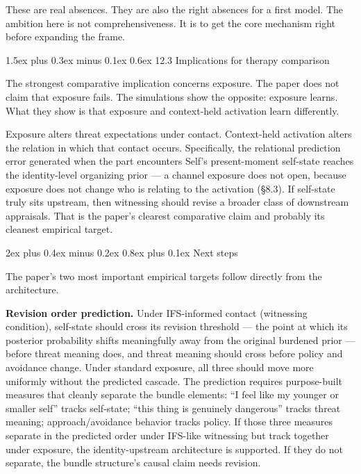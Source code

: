 \documentclass[12pt,a4paper]{article}
\makeatletter
\renewcommand\subsection{\@startsection{subsection}{2}{0pt}%
  {2ex plus 0.4ex minus 0.2ex}%
  {0.8ex plus 0.1ex}%
  {\normalsize\itshape}}
\renewcommand\subsubsection{\@startsection{subsubsection}{3}{0pt}%
  {1.5ex plus 0.3ex minus 0.1ex}%
  {0.6ex}%
  {\normalsize\itshape}}
\makeatother
\begin{document}
These are real absences. They are also the right absences for a first
model. The ambition here is not comprehensiveness. It is to get the core
mechanism right before expanding the frame.

\subsubsection{12.3 Implications for therapy
comparison}\label{implications-for-therapy-comparison}

The strongest comparative implication concerns exposure. The paper does
not claim that exposure fails. The simulations show the opposite:
exposure learns. What they show is that exposure and context-held
activation learn differently.

Exposure alters threat expectations under contact. Context-held
activation alters the relation in which that contact occurs.
Specifically, the relational prediction error generated when the part
encounters Self's present-moment self-state reaches the identity-level
organizing prior --- a channel exposure does not open, because exposure
does not change who is relating to the activation (§8.3). If self-state
truly sits upstream, then witnessing should revise a broader class of
downstream appraisals. That is the paper's clearest comparative claim
and probably its cleanest empirical target.

\subsection{Next steps}\label{next-steps}

The paper's two most important empirical targets follow directly from
the architecture.

\textbf{Revision order prediction.} Under IFS-informed contact
(witnessing condition), self-state should cross its revision threshold
--- the point at which its posterior probability shifts meaningfully
away from the original burdened prior --- before threat meaning does,
and threat meaning should cross before policy and avoidance change.
Under standard exposure, all three should move more uniformly without
the predicted cascade. The prediction requires purpose-built measures
that cleanly separate the bundle elements: ``I feel like my younger or
smaller self'' tracks self-state; ``this thing is genuinely dangerous''
tracks threat meaning; approach/avoidance behavior tracks policy. If
those three measures separate in the predicted order under IFS-like
witnessing but track together under exposure, the identity-upstream
architecture is supported. If they do not separate, the bundle
structure's causal claim needs revision.
\end{document}
